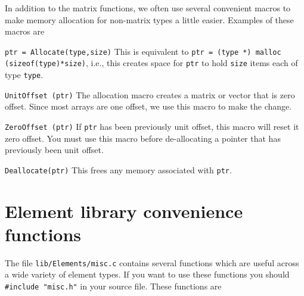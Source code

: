 In addition to the matrix functions, we often use several convenient macros
to make memory allocation for non-matrix types a little easier.  Examples of 
these macros are 

\begin{dispitems}
\item [\tt ptr = Allocate(type,size)]
 This is equivalent to \mbox{{\tt ptr = (type *) malloc (sizeof(type)*size)}},
 i.e., this creates space for {\tt ptr} to hold {\tt size} items each of type
 {\tt type}. 

\item [\tt UnitOffset (ptr)]
 The allocation macro creates a matrix or vector that is zero offset.  Since
 most \felt{} arrays are one offset, we use this macro to make the 
 change.

\item [\tt ZeroOffset (ptr)]
 If {\tt ptr} has been previously unit offset, this macro will reset it 
 zero offset.  You must use this macro before de-allocating a pointer
 that has previously been unit offset.

\item [\tt Deallocate(ptr)]
 This frees any memory associated with {\tt ptr}. 
\end{dispitems}

\section{Element library convenience functions}

The file {\tt lib/Elements/misc.c} contains several functions which 
are useful across a wide variety of element types.  If you want to use these
functions you should {\tt \#include "misc.h"} in your source file.
These functions are

